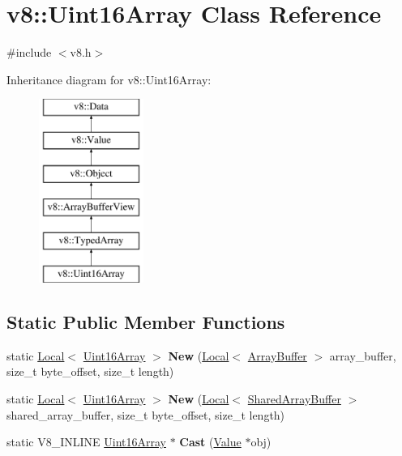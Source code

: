 \hypertarget{classv8_1_1Uint16Array}{}\section{v8\+:\+:Uint16\+Array Class Reference}
\label{classv8_1_1Uint16Array}


{\ttfamily \#include $<$v8.\+h$>$}

Inheritance diagram for v8\+:\+:Uint16\+Array\+:\begin{figure}[H]
\begin{center}
\leavevmode
\includegraphics[height=6.000000cm]{classv8_1_1Uint16Array}
\end{center}
\end{figure}
\subsection*{Static Public Member Functions}
\begin{DoxyCompactItemize}
\item 
\hypertarget{classv8_1_1Uint16Array_aa0aafae1f5a8ce1267174391c699bd20}{}static \hyperlink{classv8_1_1Local}{Local}$<$ \hyperlink{classv8_1_1Uint16Array}{Uint16\+Array} $>$ {\bfseries New} (\hyperlink{classv8_1_1Local}{Local}$<$ \hyperlink{classv8_1_1ArrayBuffer}{Array\+Buffer} $>$ array\+\_\+buffer, size\+\_\+t byte\+\_\+offset, size\+\_\+t length)\label{classv8_1_1Uint16Array_aa0aafae1f5a8ce1267174391c699bd20}

\item 
\hypertarget{classv8_1_1Uint16Array_a2e3f82cf34b770742b2ca8d7486573e2}{}static \hyperlink{classv8_1_1Local}{Local}$<$ \hyperlink{classv8_1_1Uint16Array}{Uint16\+Array} $>$ {\bfseries New} (\hyperlink{classv8_1_1Local}{Local}$<$ \hyperlink{classv8_1_1SharedArrayBuffer}{Shared\+Array\+Buffer} $>$ shared\+\_\+array\+\_\+buffer, size\+\_\+t byte\+\_\+offset, size\+\_\+t length)\label{classv8_1_1Uint16Array_a2e3f82cf34b770742b2ca8d7486573e2}

\item 
\hypertarget{classv8_1_1Uint16Array_a84b017960621903a00ef2d912233ce34}{}static V8\+\_\+\+I\+N\+L\+I\+N\+E \hyperlink{classv8_1_1Uint16Array}{Uint16\+Array} $\ast$ {\bfseries Cast} (\hyperlink{classv8_1_1Value}{Value} $\ast$obj)\label{classv8_1_1Uint16Array_a84b017960621903a00ef2d912233ce34}

\end{DoxyCompactItemize}
